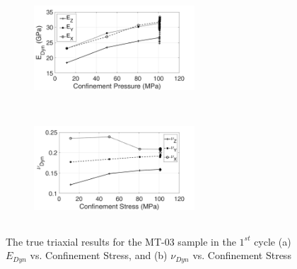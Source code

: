 \begin{figure}[ht!]
\centering
\begin{subfigure}[c]{0.48\textwidth}
\centering
\includegraphics[width=6cm,height=4cm]{figures/Amir_TrueTriaxial_MT_03_Result_E.png}
\subcaption{}
\end{subfigure}
\hfill
\begin{subfigure}[c]{0.48\textwidth}
\centering
\includegraphics[width=6cm,height=4cm]{figures/Amir_TrueTriaxial_MT_03_Result_Nu.png}
\subcaption{}
\end{subfigure}
\caption{The true triaxial results for the MT-03 sample in the $1^{st}$ cycle (a) $E_{Dyn}$ vs. Confinement Stress, and (b) $\nu_{Dyn}$ vs. Confinement Stress}
\label{fig:Amir_TrueTriaxial_MT_03_Result}
\end{figure}